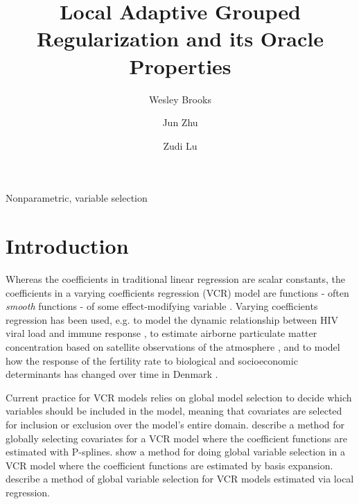 \documentclass[authoryear,review, 12pt]{elsarticle}
\begin{document}
\begin{frontmatter}

\title{Local Adaptive Grouped Regularization and its Oracle Properties}


\author[wrbrooks]{Wesley Brooks}

\author[jzhu]{Jun Zhu}

\author[zlu]{Zudi Lu}

\address[wrbrooks]{Department of Statistics, University of Wisconsin, Madison, WI 53706}
\address[jzhu]{Department of Statistics and Department of Entomology, University of Wisconsin, Madison, WI 53706}
\address[zlu]{School of Mathematical Sciences, The University of Southampton Highfield, Southampton UK}

\begin{abstract}

\end{abstract}

\begin{keyword}
Nonparametric, variable selection
\end{keyword}

\end{frontmatter}

\section{Introduction}

Whereas the coefficients in traditional linear regression are scalar
constants, the coefficients in a varying coefficients regression (VCR)
model are functions - often \emph{smooth} functions - of some effect-modifying
variable \citep{Cleveland-Grosse-1991,Hastie-Tibshirani-1993}. Varying
coefficients regression has been used, e.g. to model the dynamic relationship
between HIV viral load and immune response \citep{Liang-Wu-Carroll-2003},
to estimate airborne particulate matter concentration based on satellite
observations of the atmosphere \citep{Pelletier-Santer-Vidot-2007},
and to model how the response of the fertility rate to biological
and socioeconomic determinants has changed over time in Denmark \citep{Kohler-Rodgers-Christensen-2003}.

Current practice for VCR models relies on global model selection to
decide which variables should be included in the model, meaning that
covariates are selected for inclusion or exclusion over the model's
entire domain. \citet{Antoniadis:2012a} describe a method for globally
selecting covariates for a VCR model where the coefficient functions
are estimated with P-splines. \citet{Wang-2008a} show a method for
doing global variable selection in a VCR model where the coefficient
functions are estimated by basis expansion. \citet{Wang-Xia-2009}
describe a method of global variable selection for VCR models estimated
via local regression.
\end{document}
